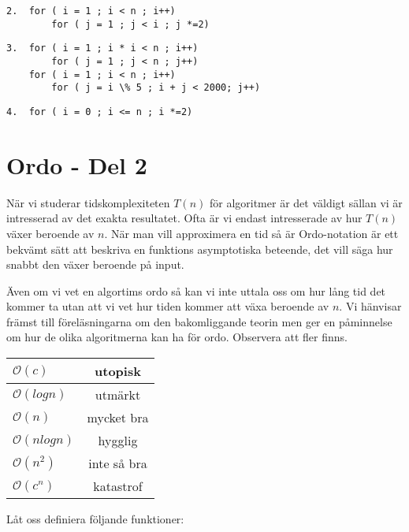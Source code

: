 \documentclass{article}
\begin{document}
    \begin{lstlisting}     
2.	for ( i = 1 ; i < n ; i++)
		for ( j = 1 ; j < i ; j *=2) 
    \end{lstlisting}
    \begin{lstlisting}
3.	for ( i = 1 ; i * i < n ; i++)
		for ( j = 1 ; j < n ; j++) 
    for ( i = 1 ; i < n ; i++)
		for ( j = i \% 5 ; i + j < 2000; j++) 
    \end{lstlisting} 
    \begin{lstlisting}   
4.	for ( i = 0 ; i <= n ; i *=2)
    \end{lstlisting}

  
   \section*{Ordo - Del 2
    }
  
  När vi studerar tidskomplexiteten $T(n)$ för algoritmer är det väldigt sällan vi är intresserad av det exakta resultatet. Ofta är vi endast intresserade av hur $T(n)$ växer beroende av $n$. När man vill approximera en tid så är Ordo-notation är ett bekvämt sätt att beskriva en funktions asymptotiska beteende, det vill säga hur snabbt den växer beroende på input.
  
Även om vi vet en algortims ordo så kan vi inte uttala oss om hur lång tid det kommer ta utan att vi vet hur tiden kommer att växa beroende av $n$. Vi hänvisar främst till föreläsningarna om den bakomliggande teorin men ger en påminnelse om hur de olika algoritmerna kan ha för ordo. Observera att fler finns. 
  
  \begin{center}
    \begin{tabular}{| l | c |}
      \hline
      \texttt{$\mathcal{O}(c)$} & utopisk\\ \hline
      \texttt{$\mathcal{O}(log n)$} & utmärkt \\ \hline
      \texttt{$\mathcal{O}(n)$} & mycket bra\\ \hline
      \texttt{$\mathcal{O}(n log n)$} & hygglig \\ \hline
      \texttt{$\mathcal{O}(n^2)$} & inte så bra \\ \hline
      \texttt{$\mathcal{O}(c^n)$} & katastrof \\
      \hline
    \end{tabular}
  \end{center}
  Låt oss definiera följande funktioner: \\
  
\end{document}
